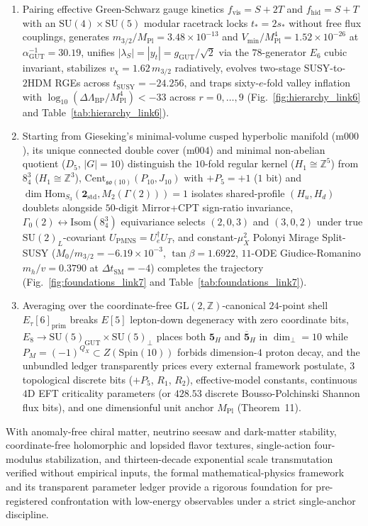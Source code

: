 \documentclass[aps,prd,twocolumn,nofootinbib,floatfix]{revtex4-2}
\begin{document}
\begin{enumerate}
    \item Pairing effective Green-Schwarz gauge kinetics $f_{\mathrm{vis}} = S + 2T$ and $f_{\mathrm{hid}} = S + T$ with an $\mathrm{SU}(4)\times\mathrm{SU}(5)$ modular racetrack locks $t_* = 2s_*$ without free flux couplings, generates $m_{3/2}/M_{\mathrm{Pl}} = 3.48\times 10^{-13}$ and $V_{\min}/M_{\mathrm{Pl}}^4 = 1.52\times 10^{-26}$ at $\alpha_{\mathrm{GUT}}^{-1} = 30.19$, unifies $|\lambda_S| = |y_t| = g_{\mathrm{GUT}}/\sqrt{2}$ via the $78$-generator $E_6$ cubic invariant, stabilizes $v_\chi = 1.62\,m_{3/2}$ radiatively, evolves two-stage SUSY-to-$2\mathrm{HDM}$ RGEs across $t_{\mathrm{SUSY}} = -24.256$, and traps sixty-$e$-fold valley inflation with $\log_{10}(\Delta\Lambda_{\mathrm{BP}}/M_{\mathrm{Pl}}^4) < -33$ across $r = 0,\dots,9$ (Fig.~\ref{fig:hierarchy_link6} and Table~\ref{tab:hierarchy_link6}).
    \item Starting from Gieseking's minimal-volume cusped hyperbolic manifold ($\mathrm{m000}$), its unique connected double cover ($\mathrm{m004}$) and minimal non-abelian quotient ($D_5$, $|G|=10$) distinguish the $10$-fold regular kernel ($H_1 \cong \mathbb{Z}^5$) from $8^3_4$ ($H_1 \cong \mathbb{Z}^3$), $\mathrm{Cent}_{\mathfrak{so}(10)}(P_{10}, J_{10})$ with $+P_5 = +1$ ($1$ bit) and $\dim\mathrm{Hom}_{S_3}(\mathbf{2}_{\mathrm{std}},M_2(\Gamma(2))) = 1$ isolates shared-profile $(H_u, H_d)$ doublets alongside $50$-digit Mirror+CPT sign-ratio invariance, $\Gamma_0(2)\leftrightarrow\mathrm{Isom}(8^3_4)$ equivariance selects $(2,0,3)$ and $(3,0,2)$ under true $\mathrm{SU}(2)_L$-covariant $U_{\mathrm{PMNS}} = U_e^\dagger U_T$, and constant-$\mu_X^2$ Polonyi Mirage Split-SUSY ($M_0/m_{3/2} = -6.19\times 10^{-3}$, $\tan\beta = 1.6922$, $11$-ODE Giudice-Romanino $m_h/v = 0.3790$ at $\Delta t_{\mathrm{SM}} = -4$) completes the trajectory (Fig.~\ref{fig:foundations_link7} and Table~\ref{tab:foundations_link7}).
    \item Averaging over the coordinate-free $\mathrm{GL}(2,\mathbb{Z})$-canonical $24$-point shell $E_\tau[6]_{\mathrm{prim}}$ breaks $E[5]$ lepton-down degeneracy with zero coordinate bits, $E_8 \to \mathrm{SU}(5)_{\mathrm{GUT}}\times\mathrm{SU}(5)_\perp$ places both $\mathbf{5}_H$ and $\overline{\mathbf{5}}_H$ in $\dim_\perp = 10$ while $P_M = (-1)^{Q_X} \subset Z(\mathrm{Spin}(10))$ forbids dimension-$4$ proton decay, and the unbundled ledger transparently prices every external framework postulate, $3$ topological discrete bits ($+P_5$, $R_1$, $R_2$), effective-model constants, continuous $4\mathrm{D}$ EFT criticality parameters (or $428.53$ discrete Bousso-Polchinski Shannon flux bits), and one dimensionful unit anchor $M_{\mathrm{Pl}}$ (Theorem~11).
\end{enumerate}
With anomaly-free chiral matter, neutrino seesaw and dark-matter stability, coordinate-free holomorphic and lopsided flavor textures, single-action four-modulus stabilization, and thirteen-decade exponential scale transmutation verified without empirical inputs, the formal mathematical-physics framework and its transparent parameter ledger provide a rigorous foundation for pre-registered confrontation with low-energy observables under a strict single-anchor discipline.
\end{document}

